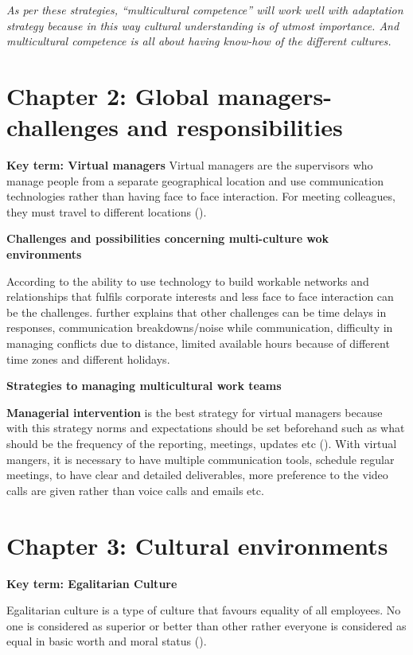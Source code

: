 \documentclass{article}
\begin{document}
\textit{As per these strategies, “multicultural competence” will work well with adaptation strategy because in this way cultural understanding is of utmost importance. And multicultural competence is all about having know-how of the different cultures.}


\section{Chapter 2: Global managers-challenges and responsibilities}
\textbf{Key term: Virtual managers}
Virtual managers are the supervisors who manage people from a separate geographical location and use communication technologies rather than having face to face interaction. For meeting colleagues, they must travel to different locations (\cite{steers2013management}).

\textbf{Challenges and possibilities concerning multi-culture wok environments}

According to \cite{steers2013management} the ability to use technology to build workable networks and relationships that fulfils corporate interests and less face to face interaction can be the challenges. \cite{vinaja2003major} further explains that other challenges can be time delays in responses, communication breakdowns/noise while communication, difficulty in managing conflicts due to distance, limited available hours because of different time zones and different holidays.

\textbf{Strategies to managing multicultural work teams}

\textbf{Managerial intervention} is the best strategy for virtual managers because with this strategy norms and expectations should be set beforehand such as what should be the frequency of the reporting, meetings, updates etc (\cite{brett2009managing}). With virtual mangers, it is necessary to have multiple communication tools, schedule regular meetings, to have clear and detailed deliverables, more preference to the video calls are given rather than voice calls and emails etc.

\section{Chapter 3: Cultural environments}
\textbf{Key term: Egalitarian Culture}

Egalitarian culture is a type of culture that favours equality of all employees. No one is considered as superior or better than other rather everyone is considered as equal in basic worth and moral status (\cite{peirce2013stanford}).
\end{document}
